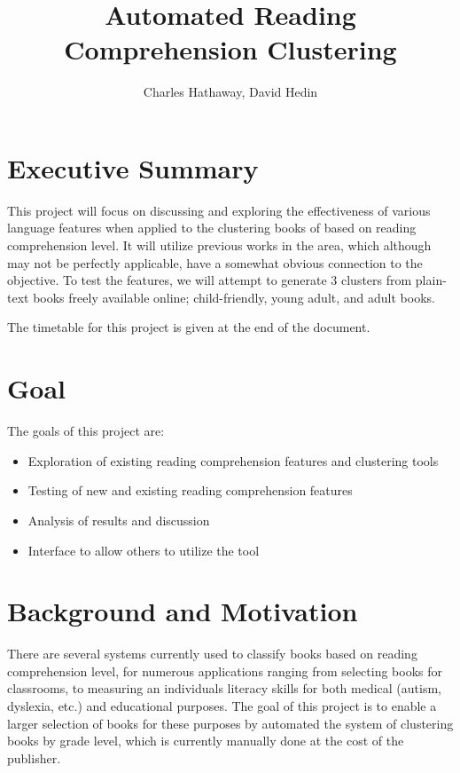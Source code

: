 \documentclass[]{article}
\title{Automated Reading Comprehension Clustering}
\author{Charles Hathaway, David Hedin}
\begin{document}
\maketitle

\section{Executive Summary}

This project will focus on discussing and exploring the effectiveness of various language features when applied to the clustering books of based on reading comprehension level.
It will utilize previous works in the area, which although may not be perfectly applicable, have a somewhat obvious connection to the objective.
To test the features, we will attempt to generate 3 clusters from plain-text books freely available online; child-friendly, young adult, and adult books.

The timetable for this project is given at the end of the document.

\section{Goal}

The goals of this project are:
\begin{itemize}
	\item Exploration of existing reading comprehension features and clustering tools
	\item Testing of new and existing reading comprehension features
	\item Analysis of results and discussion
	\item Interface to allow others to utilize the tool
\end{itemize}

\section{Background and Motivation}

There are several systems currently used to classify books based on reading comprehension level, for numerous applications ranging from selecting books for classrooms, to measuring an individuals literacy skills for both medical (autism, dyslexia, etc.) and educational purposes.
The goal of this project is to enable a larger selection of books for these purposes by automated the system of clustering books by grade level, which is currently manually done at the cost of the publisher.
\end{document}
